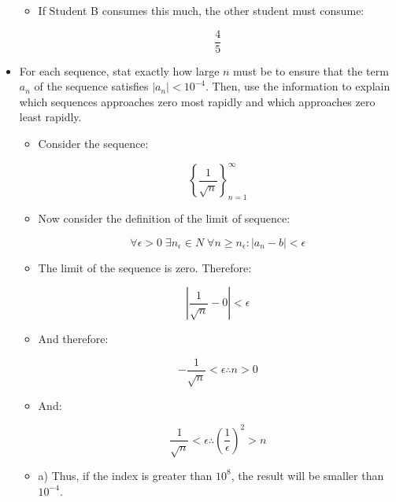 \documentclass[11pt]{article}
\begin{document}
\begin{itemize}
\begin{itemize}
	\item If Student B consumes this much, the other student must consume:
	
	\begin{equation*}
	\frac{4}{5}
	\end{equation*}
	
\end{itemize}

\item For each sequence, stat exactly how large $n$ must be to ensure that the term $a_n$ of the sequence satisfies $|a_n| < 10^{-4}$. Then, use the information to explain which sequences approaches zero most rapidly and which approaches zero least rapidly.

\begin{itemize}

	\item Consider the sequence:
	
	\begin{equation*}
	\left\{ \frac{1}{\sqrt{n}} \right\}_{n = 1}^{\infty}
	\end{equation*}
	
	\item Now consider the definition of the limit of sequence:
	
	\begin{equation*}
	\forall\epsilon>0 \; \exists n_\epsilon \in N \; \forall n \ge n_\epsilon : \left|a_n - b\right| < \epsilon
	\end{equation*}
	
	\item The limit of the sequence is zero. Therefore:
	
	\begin{equation*}
	\left|\frac{1}{\sqrt{n}} - 0\right| < \epsilon
	\end{equation*}
	
	\item And therefore:
	
	\begin{equation*}
	-\frac{1}{\sqrt{n}} < \epsilon \therefore n > 0
	\end{equation*}
	
	\item And:
	
	\begin{equation*}
	\frac{1}{\sqrt{n}} < \epsilon \therefore \left(\frac{1}{\epsilon}\right)^2 > n
	\end{equation*}
	
	\item a) Thus, if the index is greater than $10^8$, the result will be smaller than $10^{-4}$.
	

\end{itemize}
\end{itemize}
\end{document}
